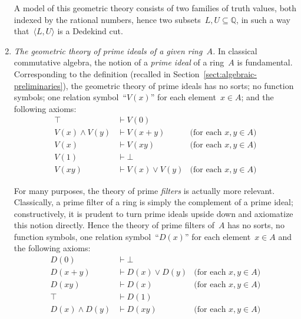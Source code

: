 \documentclass{ws-rv9x6}
\newcommand{\QQ}{\mathbb{Q}}
\renewcommand{\_}{\mathpunct{.}}
\newcommand{\?}{\,{:}\,}
\begin{document}
\begin{enumerate}
A model of this geometric theory consists of two families of truth values, both
indexed by the rational numbers, hence two subsets~$L,U \subseteq \QQ$, in such
a way that~$\langle L,U \rangle$ is a Dedekind cut.

\item \emph{The geometric theory of prime ideals of a given ring~$A$.} In classical
commutative algebra, the notion of a \emph{prime ideal} of a ring~$A$ is
fundamental. Corresponding to the definition (recalled in
Section~\ref{sect:algebraic-preliminaries}), the geometric theory of prime
ideals has no sorts; no function
symbols; one relation symbol~``$V(x)$'' for each element~$x \in A$; and the
following axioms:
\begin{align*}
  \top &\vdash V(0) \\
  V(x) \wedge V(y) &\vdash V(x+y) & \text{(for each~$x,y \in A$)} \\
  V(x) &\vdash V(xy) & \text{(for each~$x,y \in A$)} \\
  V(1) &\vdash \bot \\
  V(xy) &\vdash V(x) \vee V(y) & \text{(for each~$x,y \in A$)}
\end{align*}

For many purposes, the theory of prime \emph{filters} is actually more
relevant. Classically, a prime filter of a ring is simply the complement of a
prime ideal; constructively, it is prudent to turn prime ideals upside down and axiomatize this notion directly.
Hence the theory of prime filters of~$A$ has no sorts, no function symbols, one
relation symbol~``$D(x)$'' for each element~$x \in A$ and the following
axioms:
\begin{align*}
  D(0) &\vdash \bot \\
  D(x+y) &\vdash D(x) \vee D(y) & \text{(for each~$x,y \in A$)} \\
  D(xy) &\vdash D(x) & \text{(for each~$x,y \in A$)} \\
  \top &\vdash D(1) \\
  D(x) \wedge D(y) &\vdash D(xy) & \text{(for each~$x,y \in A$)}
\end{align*}


\end{enumerate}
\end{document}
